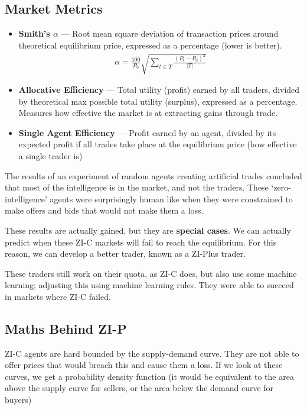 \documentclass[11pt,a4paper,titlepage,dvipsnames,cmyk]{scrartcl}
\begin{document}
\subsection{Market Metrics}
\begin{itemize}
    \item \textbf{Smith's $\alpha$} --- Root mean square deviation of transaction prices around theoretical equilibrium price, expressed as a percentage (lower is better).
    \begin{align*}
    \alpha = \frac{100}{P_0} \sqrt{\sum_{t \in T} \frac{(P_t - P_0)^2}{|T|}}
    \end{align*}
    \item \textbf{Allocative Efficiency} --- Total utility (profit) earned by all traders, divided by theoretical max possible total utility (surplus), expressed as a percentage. Measures how effective the market is at extracting gains through trade.
    \item \textbf{Single Agent Efficiency} --- Profit earned by an agent, divided by its expected profit if all trades take place at the equilibrium price (how effective a single trader is)
\end{itemize}

The results of an experiment of random agents creating artificial trades concluded that most of the intelligence is in the market, and not the traders. These `zero-intelligence' agents were surprisingly human like when they were constrained to make offers and bids that would not make them a loss.

These results are actually gained, but they are \textbf{special cases}. We can actually predict when these ZI-C markets will fail to reach the equilibrium. For this reason, we can develop a better trader, known as a ZI-Plus trader.

These traders still work on their quota, as ZI-C does, but also use some machine learning; adjusting this using machine learning rules. They were able to succeed in markets where ZI-C failed.

\subsection{Maths Behind ZI-P}
ZI-C agents are hard bounded by the supply-demand curve. They are not able to offer prices that would breach this and cause them a loss. If we look at these curves, we get a probability density function (it would be equivalent to the area above the supply curve for sellers, or the area below the demand curve for buyers)
\end{document}
